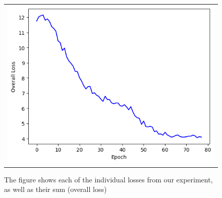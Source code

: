 \documentclass[10pt,twocolumn,letterpaper]{article}
\begin{document}
\begin{figure}[h!]
\begin{tabular}{cc}
        \multicolumn{2}{c}{\includegraphics[width=.5\textwidth]{../loss_imgs/overall.png}}
    \end{tabular}
    \caption{The figure shows each of the individual losses from our experiment, as well as their sum (overall loss)}    
    \label{fig:loss_graphs}

\end{figure}
\twocolumn
\end{document}
